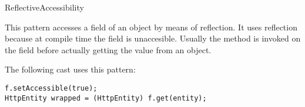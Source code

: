 
\begin{pattern}{ReflectiveAccessibility}

This pattern accesses a field of an object by means of reflection.
It uses reflection because at compile time the field is unaccesible.
Usually the method  is invoked on the field
before actually getting the value from an object.

\instances


The following cast
uses this pattern:

\begin{lstlisting}[style=java,caption=Using \code{Field::get} to gain access to a field.]
f.setAccessible(true);
HttpEntity wrapped = (HttpEntity) f.get(entity);
\end{lstlisting}

\end{pattern}
